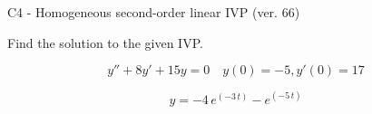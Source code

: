 \begin{exercise}
  \begin{exerciseTitle}C4 - Homogeneous second-order linear IVP (ver. 66)\end{exerciseTitle}
  \begin{exerciseStatement}
    
Find the solution to the given IVP.

    
\[y''+8y'+15y = 0 \hspace{1em} y(0) = -5 , y'(0) = 17\]

  \end{exerciseStatement}
  \begin{exerciseAnswer}
    
\[y= -4 \, e^{\left(-3 \, t\right)} - e^{\left(-5 \, t\right)}\]

  \end{exerciseAnswer}
\end{exercise}